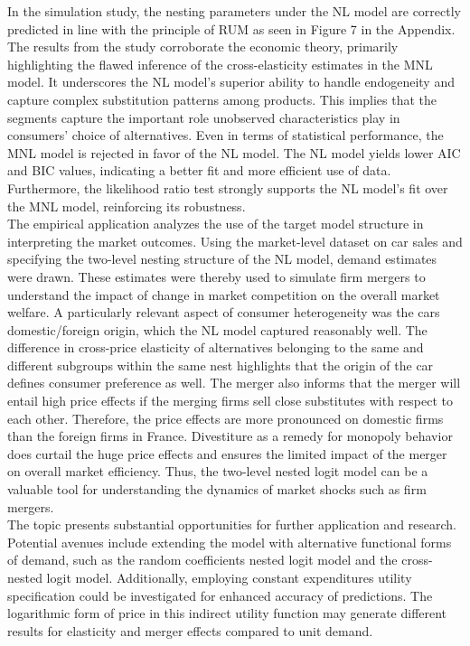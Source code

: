 \documentclass[a4paper,11pt]{article}
\begin{document}
    In the simulation study, the nesting parameters under the NL model are correctly predicted in line with the principle of RUM as seen in Figure 7 in the Appendix. The results from the study corroborate the economic theory, primarily highlighting the flawed inference of the cross-elasticity estimates in the MNL model. It underscores the NL model's superior ability to handle endogeneity and capture complex substitution patterns among products. This implies that the segments capture the important role unobserved characteristics play in consumers' choice of alternatives. Even in terms of statistical performance, the MNL model is rejected in favor of the NL model. The NL model yields lower AIC and BIC values, indicating a better fit and more efficient use of data. Furthermore, the likelihood ratio test strongly supports the NL model's fit over the MNL model, reinforcing its robustness.\\
    
    The empirical application analyzes the use of the target model structure in interpreting the market outcomes. Using the market-level dataset on car sales and specifying the two-level nesting structure of the NL model, demand estimates were drawn. These estimates were thereby used to simulate firm mergers to understand the impact of change in market competition on the overall market welfare. A particularly relevant aspect of consumer heterogeneity
    was the cars domestic/foreign origin, which the NL model captured reasonably well. The difference in cross-price elasticity of alternatives belonging to the same and different subgroups within the same nest highlights that the origin of the car defines consumer preference as well. The merger also informs that the merger will entail high price effects if the merging firms sell close substitutes with respect to each other. Therefore, the price effects are more pronounced on domestic firms than the foreign firms in France. Divestiture as a remedy for monopoly behavior does curtail the huge price effects and ensures the limited impact of the merger on overall market efficiency. Thus, the two-level nested logit model can be a valuable tool for understanding the dynamics of market shocks such as firm mergers.\\

    The topic presents substantial opportunities for further application and research. Potential avenues include extending the model with alternative functional forms of demand, such as the random coefficients nested logit model and the cross-nested logit model. Additionally, employing constant expenditures utility specification could be investigated for enhanced accuracy of predictions. The logarithmic form of price in this indirect utility function may generate different results for elasticity and merger effects compared to unit demand.\\ 
\end{document}
